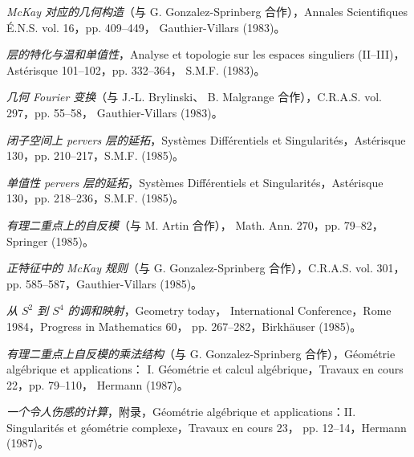 \clearpage
{}
\small
\begin{description}
\item[{[37]}] \emph{McKay 对应的几何构造}（与 G. Gonzalez-Sprinberg
合作），Annales Scientifiques É.N.S. vol. 16，pp. 409--449，
Gauthier-Villars (1983)。

\item[{[38]}] \emph{层的特化与温和单值性}，Analyse et topologie sur les
espaces singuliers (II--III)，Astérisque 101--102，pp. 332--364，
S.M.F. (1983)。

\item[{[39]}] \emph{几何 Fourier 变换}（与 J.-L. Brylinski、
B. Malgrange 合作），C.R.A.S. vol. 297，pp. 55--58，
Gauthier-Villars (1983)。

\item[{[40]}] \emph{闭子空间上 pervers 层的延拓}，Systèmes Différentiels
et Singularités，Astérisque 130，pp. 210--217，S.M.F. (1985)。

\item[{[41]}] \emph{单值性 pervers 层的延拓}，Systèmes Différentiels et
Singularités，Astérisque 130，pp. 218--236，S.M.F. (1985)。

\item[{[42]}] \emph{有理二重点上的自反模}（与 M. Artin 合作），
Math. Ann. 270，pp. 79--82，Springer (1985)。

\item[{[43]}] \emph{正特征中的 McKay 规则}（与 G. Gonzalez-Sprinberg
合作），C.R.A.S. vol. 301，pp. 585--587，Gauthier-Villars (1985)。

\item[{[44]}] \emph{从 $S^2$ 到 $S^4$ 的调和映射}，Geometry today，
International Conference，Rome 1984，Progress in Mathematics 60，
pp. 267--282，Birkhäuser (1985)。

\item[{[45]}] \emph{有理二重点上自反模的乘法结构}（与
G. Gonzalez-Sprinberg 合作），Géométrie algébrique et applications：
I. Géométrie et calcul algébrique，Travaux en cours 22，pp. 79--110，
Hermann (1987)。

\item[{[46]}] \emph{一个令人伤感的计算}，附录，Géométrie algébrique et
applications：II. Singularités et géométrie complexe，Travaux en cours 23，
pp. 12--14，Hermann (1987)。


\end{description}

